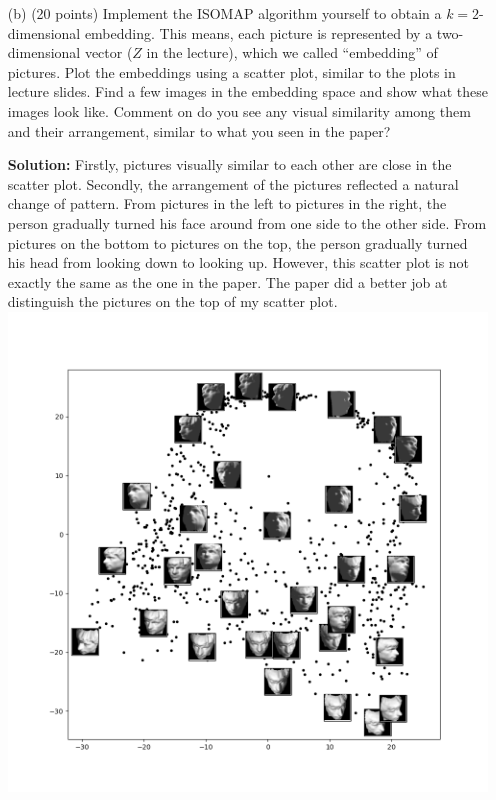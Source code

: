 \documentclass[twoside,12pt]{article}
\begin{document}
\begin{enumerate}
\item[(b)] (20 points) Implement the ISOMAP algorithm yourself to obtain a $k = 2$-dimensional embedding. This means, each picture is represented by a two-dimensional vector ($Z$ in the lecture), which we called ``embedding'' of pictures. Plot the embeddings using a scatter plot, similar to the plots in lecture slides. Find a few images in the embedding space and show what these images look like. Comment on do you see any visual similarity among them and their arrangement, similar to what you seen in the paper?
\begin{tcolorbox}
\textbf{Solution:} Firstly, pictures visually similar to each other are close in the scatter plot. Secondly, the arrangement of the pictures reflected a natural change of pattern. From pictures in the left to pictures in the right, the person gradually turned his face around from one side to the other side. From pictures on the bottom to pictures on the top, the person gradually turned his head from looking down to looking up. However, this scatter plot is not exactly the same as the one in the paper. The paper did a better job at distinguish the pictures on the top of my scatter plot.\\
\includegraphics[width=.91\textwidth]{isomap_face_scatter.png}
\end{tcolorbox}


\end{enumerate}
\end{document}
